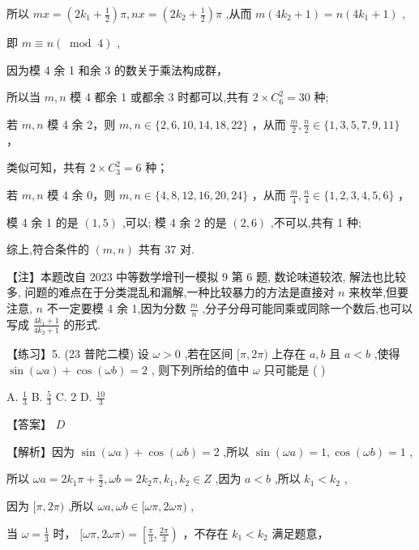 \documentclass[10pt]{article}
\newcommand*\circled[1]{\tikz[baseline=(char.base)]{\node[shape=circle,draw,inner sep=1.5pt] (char) {\small #1};}}
\begin{document}
所以 \({mx} = \left( {2{k}_{1} + \frac{1}{2}}\right) \pi ,{nx} = \left( {2{k}_{2} + \frac{1}{2}}\right) \pi\) ,从而 \(m\left( {4{k}_{2} + 1}\right)  = n\left( {4{k}_{1} + 1}\right)\) ,

即 \(m \equiv  n\left( {\;\operatorname{mod}\;4}\right)\) ,

 \circled{1} 因为模 4 余 1 和余 3 的数关于乘法构成群，

所以当 \(m,n\) 模 4 都余 1 或都余 3 时都可以,共有 \(2 \times  {C}_{6}^{2} = {30}\) 种;

 \circled{2}  若 \(m,n\) 模 4 余 2，则 \(m,n \in  \{ 2,6,{10},{14},{18},{22}\}\) ，从而 \(\frac{m}{2},\frac{n}{2} \in  \{ 1,3,5,7,9,{11}\}\) ，

类似可知，共有 \(2 \times  {C}_{3}^{2} = 6\) 种；

 \circled{3} 若 \(m,n\) 模 4 余 0，则 \(m,n \in  \{ 4,8,{12},{16},{20},{24}\}\) ，从而 \(\frac{m}{4},\frac{n}{4} \in  \{ 1,2,3,4,5,6\}\) ，

模 4 余 1 的是 \(\left( {1,5}\right)\) ,可以; 模 4 余 2 的是 \(\left( {2,6}\right)\) ,不可以,共有 1 种;

综上,符合条件的 \(\left( {m,n}\right)\) 共有 37 对.

【注】本题改自 2023 中等数学增刊一模拟 9 第 6 题, 数论味道较浓, 解法也比较多, 问题的难点在于分类混乱和漏解,一种比较暴力的方法是直接对 \(n\) 来枚举,但要注意, \(n\) 不一定要模 4 余 1,因为分数 \(\frac{m}{n}\) ,分子分母可能同乘或同除一个数后,也可以写成 \(\frac{4{k}_{1} + 1}{4{k}_{2} + 1}\) 的形式.

【练习】5. (23 普陀二模) 设 \(\omega  > 0\) ,若在区间 \(\lbrack \pi ,{2\pi })\) 上存在 \(a,b\) 且 \(a < b\) ,使得 \(\sin \left( {\omega a}\right)  + \cos \left( {\omega b}\right)  = 2\) , 则下列所给的值中 \(\omega\) 只可能是 ( )

A. \(\frac{1}{3}\) B. \(\frac{5}{3}\) C. 2 D. \(\frac{10}{3}\)

【答案】 \(D\)

【解析】因为 \(\sin \left( {\omega a}\right)  + \cos \left( {\omega b}\right)  = 2\) ,所以 \(\sin \left( {\omega a}\right)  = 1,\cos \left( {\omega b}\right)  = 1\) ,

所以 \({\omega a} = 2{k}_{1}\pi  + \frac{\pi }{2},{\omega b} = 2{k}_{2}\pi ,{k}_{1},{k}_{2} \in  Z\) ,因为 \(a < b\) ,所以 \({k}_{1} < {k}_{2}\) ,

因为 \(\lbrack \pi ,{2\pi })\) ,所以 \({\omega a},{\omega b} \in  \lbrack {\omega \pi },{2\omega \pi })\) ,

当 \(\omega  = \frac{1}{3}\) 时， \(\lbrack {\omega \pi },{2\omega \pi }) = \left\lbrack  {\frac{\pi }{3},\frac{2\pi }{3}}\right)\) ，不存在 \({k}_{1} < {k}_{2}\) 满足题意，
\end{document}
